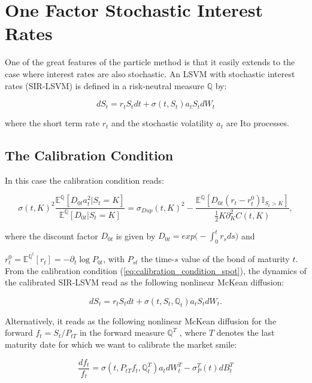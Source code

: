 \section{One Factor Stochastic Interest Rates}
One of the great features of the particle method is that it easily extends to
the case where interest rates are also stochastic. An LSVM with stochastic
interest rates (SIR-LSVM) is defined in a risk-neutral measure  $ \mathbb{Q}  $ by:

\begin{equation}  \label{eq:spot} dS_t=r_tS_t dt + \sigma(t,S_t)a_t S_tdW_t 
\end{equation}

where the short term rate $r_t$ and the stochastic volatility $a_t$ are Ito processes.
\subsection{The Calibration Condition}
In this case the calibration condition reads:

\begin{equation} \label{eq:calibration_condition_spot} \sigma(t,K)^2 \frac{\mathbb{E}^{\mathbb{Q}}[ D_{0t}a_t^2 | S_t = K ]}{ \mathbb{E}^{\mathbb{Q}}[ D_{0t} | S_t = K ] } = \sigma_{Dup}(t,K) ^2 - \frac{ \mathbb{E}^{\mathbb{Q}}[ D_{0t}(r_t-r^0_t)\mathbb{I}_{S_t>K} ]}{ \frac{1}{2}K\partial^2_KC(t,K) },
\end{equation}

where the discount factor $ D_{0t}$ is given by $ D_{0t}=exp\bigg(-\int_0^t r_sds\bigg)$ and

$r_t^0 = \mathbb{E}^{\mathbb{Q}^t} [r_t] = -\partial_t\log P_{0t}$, with $ P_{st} $ the time-$s$ value of the bond of maturity $t$.\\

From the calibration condition (\ref{eq:calibration_condition_spot}), the dynamics of the calibrated SIR-LSVM read as the following nonlinear McKean diffusion: 

$$ dS_t=r_tS_t dt + \sigma(t,S_t,\mathbb{Q}_t)a_t S_tdW_t .$$

Alternatively, it reads as the following nonlinear McKean diffusion for the
forward $f_t = S_t/P_{tT}$ in the forward measure $\mathbb{Q}^T$ , where $T$ denotes the last maturity date for which we want to calibrate the market smile:

\begin{equation}\label{eq: forwardPrice}
\frac{df_t}{f_t}= \sigma(t,P_{tT}f_t,\mathbb{Q}_t^T)a_t dW_t^T -\sigma_P^T(t)dB^T_t
\end{equation} 

